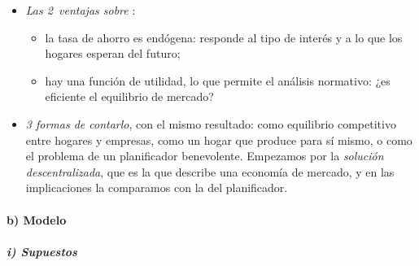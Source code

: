 \documentclass[11pt]{article}
\begin{document}
\begin{itemize}
\item \emph{Las 2~ventajas sobre }:
  \begin{itemize}
  \item la tasa de ahorro es endógena: responde al tipo de interés y a lo que los hogares esperan del futuro;
  \item hay una función de utilidad, lo que permite el análisis normativo: ¿es eficiente el equilibrio de mercado?
  \end{itemize}
\item \emph{3 formas de contarlo}, con el mismo resultado: como equilibrio competitivo entre hogares y empresas, como un hogar que produce para sí mismo, o como el problema de un planificador benevolente. Empezamos por la \emph{solución descentralizada}, que es la que describe una economía de mercado, y en las implicaciones la comparamos con la del planificador.
\end{itemize}

\paragraph{b) Modelo}

\subparagraph{i) Supuestos}
\end{document}
